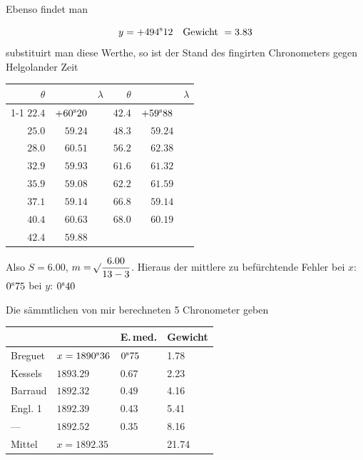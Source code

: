 Ebenso findet man

\[
y=+494^{\rm s}12 \quad \text{Gewicht } =3.83
\]
\noindent substituirt man diese Werthe, so ist der Stand des fingirten Chronometers gegen Helgolander Zeit

\begin{center}
\begingroup\small\renewcommand{\arraystretch}{1.25}
\begin{tabular}{r|r r@{\qquad}r|r r}
$\theta$ & & $\lambda$ & $\theta$ & & $\lambda$ \\
\cline{1-1}\cline{3-4}\cline{6-6}
$22.4$ & $+60^{\rm s}20$ & \raisebox{-7pt}{$-0^{\rm s}96$} & $42.4$ & $+59^{\rm s}88$ & \raisebox{-7pt}{$-0^{\rm s}62$} \\
$25.0$ & $59.24$ & \raisebox{-7pt}{$+1.27$} & $48.3$ & $59.24$ & \raisebox{-7pt}{$+3.14$} \\
$28.0$ & $60.51$ & \raisebox{-7pt}{$-0.58$} & $56.2$ & $62.38$ & \raisebox{-7pt}{$-1.06$} \\
$32.9$ & $59.93$ & \raisebox{-7pt}{$-0.85$} & $61.6$ & $61.32$ & \raisebox{-7pt}{$+0.27$} \\
$35.9$ & $59.08$ & \raisebox{-7pt}{$+0.06$} & $62.2$ & $61.59$ & \raisebox{-7pt}{$-2.45$} \\
$37.1$ & $59.14$ & \raisebox{-7pt}{$+1.47$} & $66.8$ & $59.14$ & \raisebox{-7pt}{$+1.05$} \\
$40.4$ & $60.63$ & \raisebox{-7pt}{$-0.75$} & $68.0$ & $60.19$ &  \\
$42.4$ & $59.88$ &  &  &  &  \\
\end{tabular}
\endgroup
\end{center}

Also $S=6.00$, $m=\mathord{{}^{}\!\surd}\dfrac{6.00}{13-3}$. Hieraus der mittlere zu befürchtende Fehler
bei $x$: $0^{\rm s}75$ bei $y$: $0^{\rm s}40$

Die sämmtlichen von mir berechneten 5 Chronometer geben

\begin{center}
\begin{tabular}{ll|l|l}
 & & E.\,med. & Gewicht \\
\hline
Breguet & $x=1890^{\rm s}36$ & $0^{\rm s}75$ & 1.78 \\
Kessels & $1893.29$ & $0.67$ & 2.23 \\
Barraud & $1892.32$ & $0.49$ & 4.16 \\
Engl. 1 & $1892.39$ & $0.43$ & 5.41 \\
---\quad 4 & $1892.52$ & $0.35$ & 8.16 \\
\hline
Mittel & $x=1892.35$ & & 21.74 \\
\end{tabular}
\end{center}

